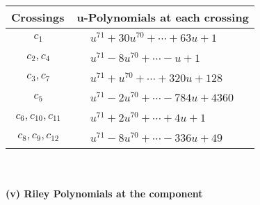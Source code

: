 \documentclass[1p]{elsarticle_modified}
\theoremstyle{definition}
\begin{document}
\begin{tabular}{m{50pt}|m{274pt}}
Crossings & \hspace{64pt}u-Polynomials at each crossing \\
\hline $$\begin{aligned}c_{1}\end{aligned}$$&$\begin{aligned}
&u^{71}+30 u^{70}+\cdots+63 u+1
\end{aligned}$\\
\hline $$\begin{aligned}c_{2},c_{4}\end{aligned}$$&$\begin{aligned}
&u^{71}-8 u^{70}+\cdots- u+1
\end{aligned}$\\
\hline $$\begin{aligned}c_{3},c_{7}\end{aligned}$$&$\begin{aligned}
&u^{71}+u^{70}+\cdots+320 u+128
\end{aligned}$\\
\hline $$\begin{aligned}c_{5}\end{aligned}$$&$\begin{aligned}
&u^{71}-2 u^{70}+\cdots-784 u+4360
\end{aligned}$\\
\hline $$\begin{aligned}c_{6},c_{10},c_{11}\end{aligned}$$&$\begin{aligned}
&u^{71}+2 u^{70}+\cdots+4 u+1
\end{aligned}$\\
\hline $$\begin{aligned}c_{8},c_{9},c_{12}\end{aligned}$$&$\begin{aligned}
&u^{71}-8 u^{70}+\cdots-336 u+49
\end{aligned}$\\
\hline
\end{tabular}\\~\\
\newpage\renewcommand{\arraystretch}{1}
\flushleft \textbf{(v) Riley Polynomials at the component}\newline \\
\end{document}
